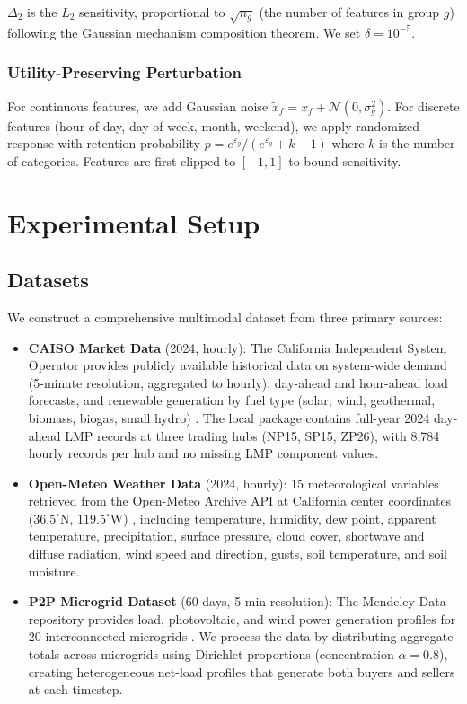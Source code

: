 \documentclass{ieeeaccess}
\begin{document}
$\Delta_2$ is the $L_2$ sensitivity, proportional to $\sqrt{n_g}$ (the number of features in group $g$) following the Gaussian mechanism composition theorem. We set $\delta = 10^{-5}$.

\subsubsection{Utility-Preserving Perturbation}

For continuous features, we add Gaussian noise $\tilde{x}_f = x_f + \mathcal{N}(0, \sigma_g^2)$. For discrete features (hour of day, day of week, month, weekend), we apply randomized response with retention probability $p = e^{\varepsilon_g} / (e^{\varepsilon_g} + k - 1)$ where $k$ is the number of categories. Features are first clipped to $[-1, 1]$ to bound sensitivity.

\section{Experimental Setup}
\label{sec:experiments}

\subsection{Datasets}
\label{sec:datasets}

We construct a comprehensive multimodal dataset from three primary sources:

\begin{itemize}
  \item \textbf{CAISO Market Data} (2024, hourly): The California Independent System Operator provides publicly available historical data on system-wide demand (5-minute resolution, aggregated to hourly), day-ahead and hour-ahead load forecasts, and renewable generation by fuel type (solar, wind, geothermal, biomass, biogas, small hydro) \cite{b36}. The local package contains full-year 2024 day-ahead LMP records at three trading hubs (NP15, SP15, ZP26), with 8,784 hourly records per hub and no missing LMP component values.

  \item \textbf{Open-Meteo Weather Data} (2024, hourly): 15 meteorological variables retrieved from the Open-Meteo Archive API at California center coordinates ($36.5^{\circ}$N, $119.5^{\circ}$W) \cite{b37}, including temperature, humidity, dew point, apparent temperature, precipitation, surface pressure, cloud cover, shortwave and diffuse radiation, wind speed and direction, gusts, soil temperature, and soil moisture.

  \item \textbf{P2P Microgrid Dataset} (60 days, 5-min resolution): The Mendeley Data repository provides load, photovoltaic, and wind power generation profiles for 20 interconnected microgrids \cite{b38}. We process the data by distributing aggregate totals across microgrids using Dirichlet proportions (concentration $\alpha=0.8$), creating heterogeneous net-load profiles that generate both buyers and sellers at each timestep.
\end{itemize}
\end{document}
